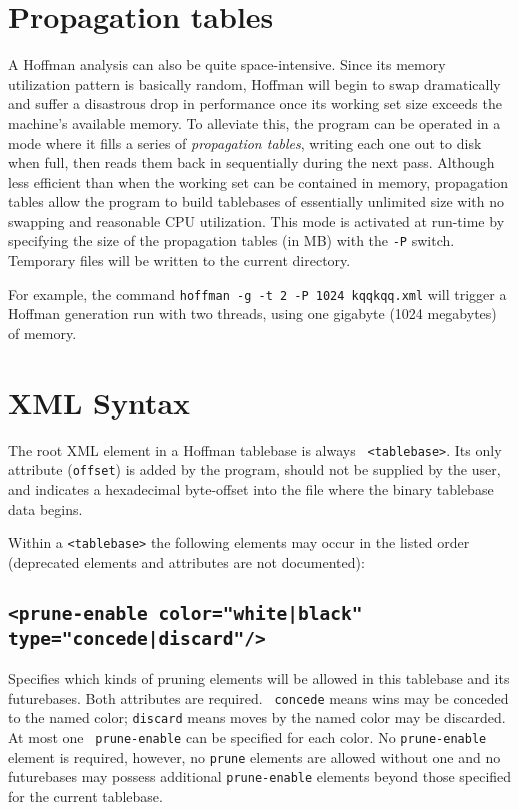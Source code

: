 \documentclass[11pt]{article}
\begin{document}
\section{Propagation tables}

A Hoffman analysis can also be quite space-intensive.  Since its
memory utilization pattern is basically random, Hoffman will begin to
swap dramatically and suffer a disastrous drop in performance once its
working set size exceeds the machine's available memory.  To alleviate
this, the program can be operated in a mode where it fills a series of
{\it propagation tables}, writing each one out to disk when full, then
reads them back in sequentially during the next pass.  Although less
efficient than when the working set can be contained in memory,
propagation tables allow the program to build tablebases of
essentially unlimited size with no swapping and reasonable CPU
utilization.  This mode is activated at run-time by specifying the
size of the propagation tables (in MB) with the {\tt -P} switch.
Temporary files will be written to the current directory.

For example, the command {\tt hoffman -g -t 2 -P 1024 kqqkqq.xml} will
trigger a Hoffman generation run with two threads, using one gigabyte
(1024 megabytes) of memory.

\vfil\eject
\section{XML Syntax}

The root XML element in a Hoffman tablebase is always {\tt
<tablebase>}.  Its only attribute ({\tt offset}) is added by the
program, should not be supplied by the user, and indicates a
hexadecimal byte-offset into the file where the binary tablebase data
begins.

Within a {\tt <tablebase>} the following elements may
occur in the listed order (deprecated elements and attributes are not
documented):

\subsection{\tt <prune-enable color="white|black" type="concede|discard"/>}

Specifies which kinds of pruning elements will be allowed in this
tablebase and its futurebases.  Both attributes are required.  {\tt
concede} means wins may be conceded to the named color; {\tt discard}
means moves by the named color may be discarded.  At most one {\tt
prune-enable} can be specified for each color.  No {\tt prune-enable}
element is required, however, no {\tt prune} elements are allowed without
one and no futurebases may possess additional {\tt prune-enable}
elements beyond those specified for the current tablebase.
\end{document}
